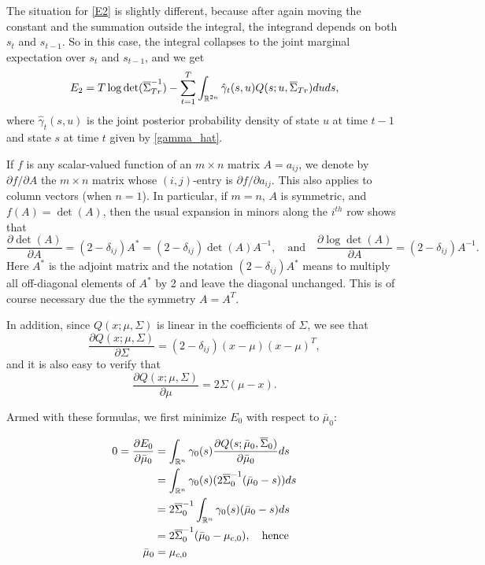 \documentclass[12pt,leqno]{article}
\begin{document}
The situation for \eqref{E2} is slightly different, because after again moving the constant and the summation outside
the integral, the integrand depends on both $s_t$ and $s_{t-1}$.  So in this case, the integral collapses to the 
joint marginal expectation over $s_t$ and $s_{t-1}$, and we get
$$
E_2 = T\log\det(\overline{\Sigma}^{-1}_{Tr}) - \sum_{t=1}^T\int_{{\mathbb R}^{2n}}\hat{\gamma}_t(s,u)Q(s;u,\overline{\Sigma}_{Tr})duds,
$$
where $\hat{\gamma}_t(s,u)$ is the joint posterior probability density of state $u$ at time $t-1$ and state $s$ 
at time $t$ given by \eqref{gamma_hat}.

If $f$ is any scalar-valued function of an $m\times{n}$ matrix $A = a_{ij}$, we denote by $\partial{f}/\partial{A}$ the 
$m\times{n}$ matrix whose $(i,j)$-entry is $\partial{f}/\partial{a_{ij}}$.  This also applies to column vectors (when $n=1$).
In particular, if $m=n$, $A$ is symmetric, and $f(A) = \det(A)$,  then the usual expansion 
in minors along the $i^{th}$ row shows that 
$$
\frac{\partial{\det(A)}}{\partial{A}} = (2-\delta_{ij})A^* = (2-\delta_{ij})\det(A)A^{-1},\quad\text{and}
\quad\frac{\partial{\log\det(A)}}{\partial{A}} = (2-\delta_{ij})A^{-1}. 
$$
Here $A^*$ is the adjoint matrix and the notation $(2-\delta_{ij})A^*$ means to multiply all off-diagonal elements of $A^*$ by 2
and leave the diagonal unchanged.  This is of course necessary due the the symmetry $A = A^T$.

In addition, since $Q(x;\mu,\Sigma)$ is linear in the coefficients of $\Sigma$, we see that
$$
\frac{\partial{Q(x;\mu,\Sigma)}}{\partial{\Sigma}} = (2-\delta_{ij})(x-\mu)(x-\mu)^T,
$$
and it is also easy to verify that
$$
\frac{\partial{Q(x;\mu,\Sigma)}}{\partial{\mu}} = 2\Sigma(\mu-x).
$$

Armed with these formulas, we first minimize $E_0$ with respect to $\bar{\mu}_0$: 
 
\begin{align}
0 = \frac{\partial{E_0}}{\partial{\bar{\mu}_0}} &= \int_{{\mathbb R}^n}\gamma_0(s)\frac{\partial{Q(s;\bar{\mu}_0,\overline{\Sigma}_0)}}{\partial{\bar{\mu}_0}}ds \notag\\
&= \int_{{\mathbb R}^n}\gamma_0(s)(2\overline{\Sigma}_0^{-1}(\bar{\mu}_0-s))ds\notag\\
&= 2\overline{\Sigma}_0^{-1}\int_{{\mathbb R}^n}\gamma_0(s)(\bar{\mu}_0-s)ds \notag\\
&= 2\overline{\Sigma}_0^{-1}(\bar{\mu}_0-\mu_{c,0}), \quad\text{hence}\notag\\
\bar{\mu}_0 &= \mu_{c,0}\label{mu_0}
\end{align}
\end{document}
